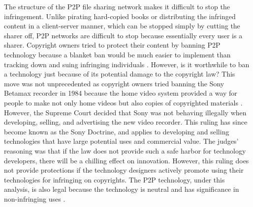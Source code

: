 \documentclass[12pt]{article}
\begin{document}
The structure of the P2P file sharing network makes it difficult to stop the infringement. Unlike pirating hard-copied books or distributing the infringed content in a client-server manner, which can be stopped simply by cutting the sharer off, P2P networks are difficult to stop because essentially every user is a sharer. Copyright owners tried to protect their content by banning P2P technology because a blanket ban would be much easier to implement than tracking down and suing infringing individuals \cite{14_lemley2005quick}. However, is it worthwhile to ban a technology just because of its potential damage to the copyright law? This move was not unprecedented as copyright owners tried banning the Sony Betamax recorder in 1984 because the home video system provided a way for people to make not only home videos but also copies of copyrighted materials \cite{13_LeeEdward2005TEoI}. However, the Supreme Court decided that Sony was not behaving illegally when developing, selling, and advertising the new video recorder. This ruling has since become known as the Sony Doctrine, and applies to developing and selling technologies that have large potential uses and commercial value. The judges' reasoning was that if the law does not provide such a safe harbor for technology developers, there will be a chilling effect on innovation. However, this ruling does not provide protections if the technology designers actively promote using their technologies for infringing on copyrights. The P2P technology, under this analysis, is also legal because the technology is neutral and has significance in non-infringing uses \cite{13_LeeEdward2005TEoI}. 
\end{document}
